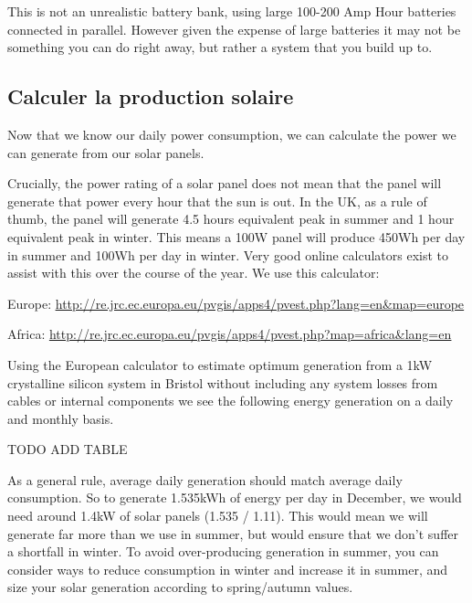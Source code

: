 \documentclass{article}
\theoremstyle{definition}
\theoremstyle{definition}
\theoremstyle{remark}
\begin{document}
    This is not an unrealistic battery bank, using large 100-200 Amp Hour batteries connected in parallel. However given the expense of large batteries it may not be something you can do right away, but rather a system that you build up to.


  {\color{blue}\subsection{Calculer la production solaire}} %
  \label{sub:calculer_la_production_solaire}

    Now that we know our daily power consumption, we can calculate the power we can generate from our solar panels.

    Crucially, the power rating of a solar panel does not mean that the panel will generate that power every hour that the sun is out. In the UK, as a rule of thumb, the panel will generate 4.5 hours equivalent peak in summer and 1 hour equivalent peak in winter. This means a 100W panel will produce 450Wh per day in summer and 100Wh per day in winter. Very good online calculators exist to assist with this over the course of the year. We use this calculator:

    Europe: \href{http://re.jrc.ec.europa.eu/pvgis/apps4/pvest.php?lang=en\&map=europe}{\underline{http://re.jrc.ec.europa.eu/pvgis/apps4/pvest.php?lang=en\&map=europe}}

    Africa: \href{http://re.jrc.ec.europa.eu/pvgis/apps4/pvest.php?map=africa\&lang=en}{\underline{http://re.jrc.ec.europa.eu/pvgis/apps4/pvest.php?map=africa\&lang=en}}

    Using the European calculator to estimate optimum generation from a 1kW crystalline silicon system in Bristol without including any system losses from cables or internal components we see the following energy generation on a daily and monthly basis.

    TODO ADD TABLE

    As a general rule, average daily generation should match average daily consumption. So to generate 1.535kWh of energy per day in December, we would need around 1.4kW of solar panels (1.535 / 1.11). This would mean we will generate far more than we use in summer, but would ensure that we don’t suffer a shortfall in winter. To avoid over-producing generation in summer, you can consider ways to reduce consumption in winter and increase it in summer, and size your solar generation according to spring/autumn values.
  
\end{document}
